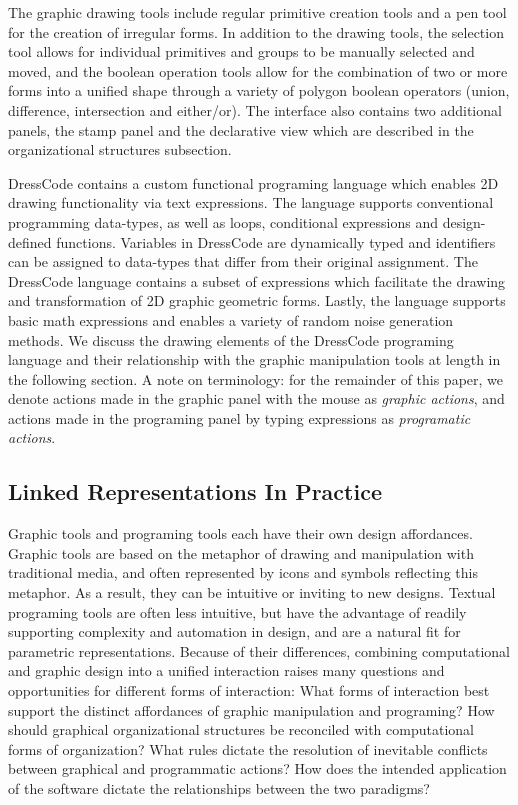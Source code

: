 \documentclass{sigchi}
\begin{document}
The graphic drawing tools include regular primitive creation tools and a pen tool for the creation of irregular forms.  In addition to the drawing tools, the selection tool allows for individual primitives and groups to be manually selected and moved, and the boolean operation tools allow for the combination of two or more forms into a unified shape through a variety of polygon boolean operators (union, difference, intersection and either/or). The interface also contains two additional panels, the stamp panel and the declarative view which are described in the organizational structures subsection.

 DressCode contains a custom functional programing language which enables 2D drawing functionality via text expressions. The language supports conventional programming data-types, as well as loops, conditional expressions and design-defined functions. Variables in DressCode are dynamically typed and identifiers can be assigned to data-types that differ from their original assignment. The DressCode language contains a subset of expressions which facilitate the drawing and transformation of 2D graphic geometric forms. Lastly, the language supports basic math expressions and enables a variety of random noise generation methods. We discuss the drawing elements of the DressCode programing language and their relationship with the graphic manipulation tools at length in the following section. A note on terminology: for the remainder of this paper, we denote actions made in the graphic panel with the mouse as \textit{graphic actions}, and actions made in the programing panel by typing expressions as \textit{programatic actions}.


\subsection{Linked Representations In Practice}
Graphic tools and programing tools each have their own design affordances. Graphic tools are based on the metaphor of drawing and manipulation with traditional media, and often represented by icons and symbols reflecting this metaphor. As a result, they can be intuitive or inviting to new designs. Textual programing tools are often less intuitive, but have the advantage of readily supporting complexity and automation in design, and are a natural fit for parametric representations. Because of their differences, combining computational and graphic design into a unified interaction raises many questions and opportunities for different forms of interaction: What forms of interaction best support the distinct affordances of graphic manipulation and programing? How should graphical organizational structures be reconciled with computational forms of organization? What rules dictate the resolution of inevitable conflicts between graphical and programmatic actions? How does the intended application of the software dictate the relationships between the two paradigms?
\end{document}
